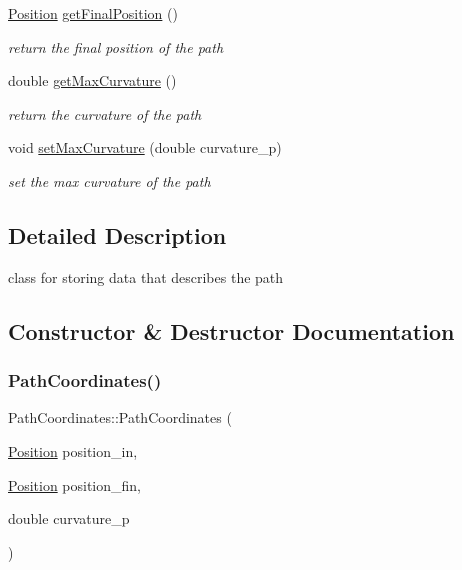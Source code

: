 \begin{DoxyCompactItemize}
\mbox{\hyperlink{class_position}{Position}} \mbox{\hyperlink{class_path_coordinates_af4d85fae7c4ed67ea5201895d1ee4b7b}{get\+Final\+Position}} ()
\begin{DoxyCompactList}\small\item\em return the final position of the path \end{DoxyCompactList}\item 
double \mbox{\hyperlink{class_path_coordinates_a6b0315b737b35af2e198a7094828741e}{get\+Max\+Curvature}} ()
\begin{DoxyCompactList}\small\item\em return the curvature of the path \end{DoxyCompactList}\item 
void \mbox{\hyperlink{class_path_coordinates_abd7e9a8143e368f9290b962f595ae0a8}{set\+Max\+Curvature}} (double curvature\+\_\+p)
\begin{DoxyCompactList}\small\item\em set the max curvature of the path \end{DoxyCompactList}\end{DoxyCompactItemize}


\subsection{Detailed Description}
class for storing data that describes the path 

\subsection{Constructor \& Destructor Documentation}
\mbox{\label{class_path_coordinates_a6540a40d24cb4e50577eda489b7fe1bb}} 
\subsubsection{\texorpdfstring{Path\+Coordinates()}{PathCoordinates()}}
{\footnotesize\ttfamily Path\+Coordinates\+::\+Path\+Coordinates (\begin{DoxyParamCaption}\item[{\mbox{\hyperlink{class_position}{Position}}}]{position\+\_\+in,  }\item[{\mbox{\hyperlink{class_position}{Position}}}]{position\+\_\+fin,  }\item[{double}]{curvature\+\_\+p }\end{DoxyParamCaption})}



